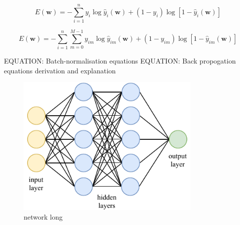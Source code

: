\begin{equation} %
    E(\boldsymbol{w})=
    -\displaystyle\sum_{i=1}^{n}y_{i}\log\hat{y}_{i}(\boldsymbol{w})+
    (1-y_{i})\log[1-\hat{y}_{i}(\boldsymbol{w})]
\end{equation} %

\begin{equation} %
    E(\boldsymbol{w})=
    -\displaystyle\sum_{i=1}^{n}\displaystyle\sum_{m=0}^{M-1}y_{im}\log\hat{y}_{im}(\boldsymbol{w})+
    (1-y_{im})\log[1-\hat{y}_{im}(\boldsymbol{w})]
\end{equation} %

EQUATION: Batch-normalisation equations
EQUATION: Back propogation equations derivation and explanation

\begin{figure} %
    \includegraphics[width=0.8\textwidth]{diagrams/6-cvn/network.pdf}
    \caption[network short]
    {network long}
    \label{fig:network}
\end{figure} %

